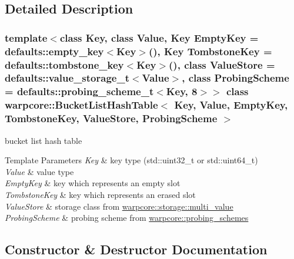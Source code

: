 \subsection{Detailed Description}
\subsubsection*{template$<$class Key, class Value, Key Empty\+Key = defaults\+::empty\+\_\+key$<$\+Key$>$(), Key Tombstone\+Key = defaults\+::tombstone\+\_\+key$<$\+Key$>$(), class Value\+Store = defaults\+::value\+\_\+storage\+\_\+t$<$\+Value$>$, class Probing\+Scheme = defaults\+::probing\+\_\+scheme\+\_\+t$<$\+Key, 8$>$$>$\newline
class warpcore\+::\+Bucket\+List\+Hash\+Table$<$ Key, Value, Empty\+Key, Tombstone\+Key, Value\+Store, Probing\+Scheme $>$}

bucket list hash table 


\begin{DoxyTemplParams}{Template Parameters}
{\em Key} & key type ({\ttfamily std\+::uint32\+\_\+t} or {\ttfamily std\+::uint64\+\_\+t}) \\
\hline
{\em Value} & value type \\
\hline
{\em Empty\+Key} & key which represents an empty slot \\
\hline
{\em Tombstone\+Key} & key which represents an erased slot \\
\hline
{\em Value\+Store} & storage class from {\ttfamily \hyperlink{namespacewarpcore_1_1storage_1_1multi__value}{warpcore\+::storage\+::multi\+\_\+value}} \\
\hline
{\em Probing\+Scheme} & probing scheme from {\ttfamily \hyperlink{namespacewarpcore_1_1probing__schemes}{warpcore\+::probing\+\_\+schemes}} \\
\hline
\end{DoxyTemplParams}


\subsection{Constructor \& Destructor Documentation}
\mbox{\label{classwarpcore_1_1BucketListHashTable_afc66a5887318d7daba8c901126324732}} 
